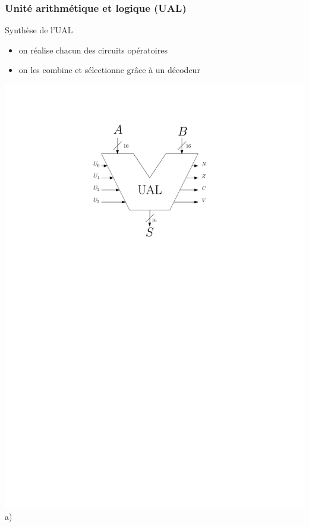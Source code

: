 \documentclass{beamer}
\begin{document}
\begin{frame}
\frametitle{Unité arithmétique et logique (UAL)}
\begin{block}{Synthèse de l'UAL}
\begin{itemize}
\item on réalise chacun des circuits opératoires
\item on les combine et sélectionne grâce à un décodeur
\end{itemize}

   \begin{minipage}[c]{.4\linewidth}
\includegraphics[width=\linewidth]{Figs/ual.pdf}\\\centering a)
   \end{minipage} \hfill
   \begin{minipage}[c]{.58\linewidth}

\end{minipage}
\end{block}
\end{frame}
\end{document}
